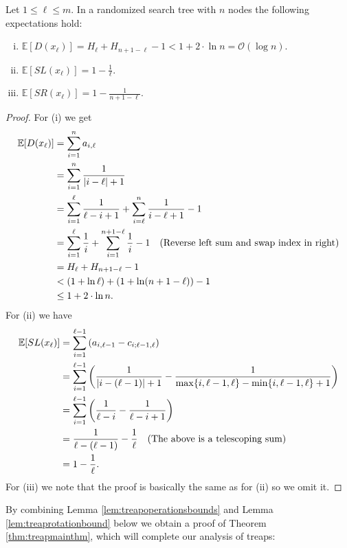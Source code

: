 \begin{thm} \label{thm:treapbounds}
Let $1 \leq \ell \leq m$. In a randomized search tree with $n$ nodes the following expectations hold:
\begin{enumerate}[(i)]
    \item $\mathbb{E}[D(x_{\ell})] = H_{\ell} + H_{n+1-\ell} - 1 < 1 + 2 \cdot \ln n = \mathcal{O}(\log n)$.
    \item $\mathbb{E}[SL(x_{\ell})] = 1 - \displaystyle \frac{1}{\ell}$.
    \item $\mathbb{E}[SR(x_{\ell})] = 1 - \displaystyle \frac{1}{n + 1 - \ell}$.
\end{enumerate}
\end{thm}
\begin{proof}
For (i) we get
\begin{align*}
    \mathbb{E}[D(x_{\ell})] &= \sum_{i=1}^n a_{i,\ell} \\
    &= \sum_{i=1}^n \frac{1}{\left\lvert i - \ell \right\rvert + 1} \\
    &= \sum_{i=1}^{\ell} \frac{1}{\ell - i + 1} + \sum_{i=\ell}^{n} \frac{1}{i - \ell + 1} - 1 \\
    &= \sum_{i=1}^{\ell} \frac{1}{i} + \sum_{i=1}^{n+1-\ell} \frac{1}{i} - 1 \quad \text{(Reverse left sum and swap index in right)} \\
    &= H_{\ell} + H_{n+1-\ell} - 1 \\
    &< (1 + \ln \ell) + (1 + \ln (n + 1 - \ell)) - 1 \\
    &\leq 1 + 2 \cdot \ln n.
\end{align*}
For (ii) we have
\begin{align*}
    \mathbb{E}[SL(x_{\ell})] &= \sum_{i=1}^{\ell - 1} \left(a_{i,\ell-1} - c_{i;\ell-1,\ell}\right) \\
    &= \sum_{i=1}^{\ell - 1} \left(\frac{1}{\left\lvert i - (\ell - 1) \right\rvert + 1} - \frac{1}{\max\{i,\ell-1,\ell\}-\min\{i,\ell-1,\ell\}+1}\right) \\
    &= \sum_{i=1}^{\ell - 1} \left(\frac{1}{\ell - i} - \frac{1}{\ell - i + 1}\right) \\
    &= \frac{1}{\ell - (\ell - 1)} - \frac{1}{\ell} \quad \text{(The above is a telescoping sum)} \\
    &= 1 - \frac{1}{\ell}.
\end{align*}
For (iii) we note that the proof is basically the same as for (ii) so we omit it.
\end{proof}

By combining Lemma \ref{lem:treapoperationsbounds} and Lemma \ref{lem:treaprotationbound} below we obtain a proof of Theorem \ref{thm:treapmainthm}, which will complete our analysis of treaps:

